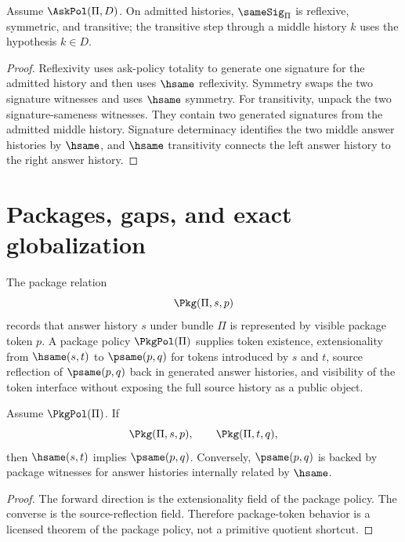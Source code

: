 \begin{theorem}
\label{thm:ask-sig-spine-samesig-classifier}
Assume $\AskPol(\Pi,D)$.  On admitted histories, $\sameSig_{\Pi}$ is
reflexive, symmetric, and transitive; the transitive step through a middle
history $k$ uses the hypothesis $k\in D$.
\end{theorem}

\begin{proof}
Reflexivity uses ask-policy totality to generate one signature for the
admitted history and then uses $\hsame$ reflexivity.  Symmetry swaps the two
signature witnesses and uses $\hsame$ symmetry.  For transitivity, unpack the
two signature-sameness witnesses.  They contain two generated signatures from
the admitted middle history.  Signature determinacy identifies the two middle
answer histories by $\hsame$, and $\hsame$ transitivity connects the left
answer history to the right answer history.
\end{proof}

\section{Packages, gaps, and exact globalization}
\label{sec:ask-sig-spine-packages-gaps}

\begin{definition}
\label{def:ask-sig-spine-package-policy}
The package relation
$$
\Pkg(\Pi,s,p)
$$
records that answer history $s$ under bundle $\Pi$ is represented by visible
package token $p$.  A package policy $\PkgPol(\Pi)$ supplies token existence,
extensionality from $\hsame(s,t)$ to $\psame(p,q)$ for tokens introduced by
$s$ and $t$, source reflection of $\psame(p,q)$ back in generated answer histories,
and visibility of the token interface without exposing the full source
history as a public object.
\end{definition}

\begin{theorem}
\label{thm:ask-sig-spine-packages-classify-signatures}
Assume $\PkgPol(\Pi)$.  If
$$
\Pkg(\Pi,s,p),
\qquad
\Pkg(\Pi,t,q),
$$
then $\hsame(s,t)$ implies $\psame(p,q)$.  Conversely, $\psame(p,q)$ is
backed by package witnesses for answer histories internally related by
$\hsame$.
\end{theorem}

\begin{proof}
The forward direction is the extensionality field of the package policy.
The converse is the source-reflection field.  Therefore package-token behavior is a
licensed theorem of the package policy, not a primitive quotient shortcut.
\end{proof}

